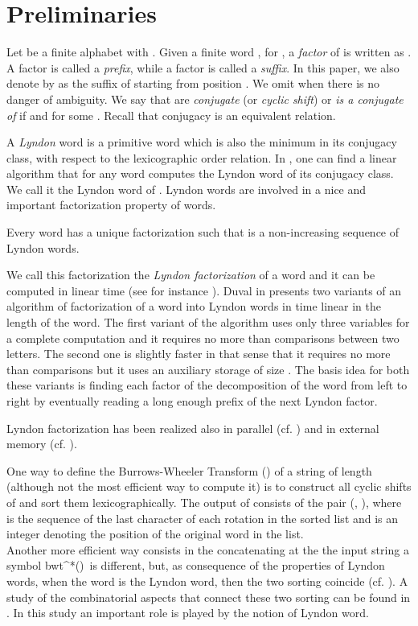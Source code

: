 \documentclass[envcountsame,runningheads]{llncs}
\begin{document}
\section{Preliminaries}\label{sec:prel}

Let  be a finite alphabet with .
Given a finite word ,  for ,
a \emph{factor} of  is written as . A factor  is called a \emph{prefix}, while a factor  is called a \emph{suffix}.
In this paper, we also denote by  as the suffix of  starting from position . We omit  when there is no danger of ambiguity.
We say that  are {\em conjugate} (or \emph{cyclic shift}) or \emph{ is a conjugate of } if  and  for some . Recall that conjugacy is an equivalent relation.

A {\em Lyndon} word is a primitive word which is also the minimum in its conjugacy class, with respect to the lexicographic order relation.
In \cite{Lothaire:2005,Duval1983}, one can find a linear algorithm that for any word  computes the Lyndon word of its conjugacy class.
We call it the Lyndon word of .
Lyndon words are involved in a nice and important factorization property of words.
\begin{theorem}\cite{ChenFoxLyndon1958}
Every word  has a unique factorization  such that  is a non-increasing sequence of Lyndon words.
\end{theorem}
We call this factorization the \emph{Lyndon factorization}  of a word and it can be computed in linear time (see for instance \cite{Duval1983,Lothaire:2005}).
Duval in \cite{Duval1983} presents two variants of an algorithm of factorization of a word into Lyndon words in time linear in the length of the word.
The first variant of the algorithm uses only three variables for a complete computation and it requires no more than  comparisons between two letters.
The second one is slightly faster in that sense that it requires no more than  comparisons but it uses an auxiliary storage of size .
The basis idea for both these variants is finding each factor of the decomposition of the word  from left to right by eventually reading a long enough prefix of the next Lyndon factor.

Lyndon factorization has been realized also in parallel (cf. \cite{ApostolicoCrochemore1995}) and in external memory (cf. \cite{RohCrochemoreIliopoulosPark:2008}).

One way to define the Burrows-Wheeler Transform () \cite{bwt94} of a string  of length  (although not the most efficient way to compute it) is to construct all  cyclic shifts of  and sort them lexicographically. The output of  consists of the pair (, ), where  is the sequence of the last character of each rotation in the sorted list and  is an integer denoting the position of the original word in the list.\\
Another more efficient way consists in the concatenating at the the input string  a symbol bwt\bigT\in \Sigma^*\lbwt(\bigT)\bigT\ is different, but, as consequence of the properties of Lyndon words, when the word  is the Lyndon word, then the two sorting coincide (cf. \cite[Lemma 12]{GRS2007}).
A study of the combinatorial aspects that connect these two sorting can be found in \cite{BonomoMRRSDLT2013}. In this study an important role is played by the notion of Lyndon word.
\end{document}
